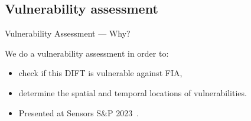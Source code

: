 \subsection{Vulnerability assessment}
\begin{frame}{Vulnerability Assessment — Why?}
    \begin{block}{}
        We do a vulnerability assessment in order to:
        \begin{itemize}
            [triangle]
            \justifying
            \item check if this DIFT is vulnerable against FIA,
            \item determine the spatial and temporal locations of vulnerabilities.
        \end{itemize}
    \end{block}

    \begin{block}{}
        \begin{itemize}
            \item Presented at Sensors S\&P 2023~\cite{PLG-23-SensorsSP}.
        \end{itemize}
    \end{block}
\end{frame}

